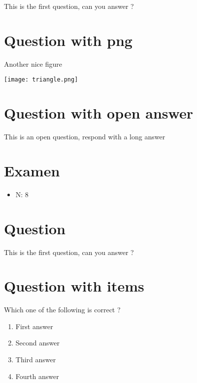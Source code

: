 \documentclass[a4paper,11pt,twoside]{article}
\begin{document}
This is the first question, can you answer ?



\section*{Question with png}
\label{sec:orge5484e8}

Another nice figure

\begin{center}
\texttt{[image: triangle.png]}
\end{center}



\section*{Question with open answer}
\label{sec:orga753518}

This is an open question, respond with a long answer


\subsection*{}
\label{sec:org8df2900}

\cleardoublepage

\section*{Examen}
\label{sec:org1f82a00}
\begin{itemize}
\item N: 8
\end{itemize}
\section*{Question}
\label{sec:org13194cb}

This is the first question, can you answer ?



\section*{Question with items}
\label{sec:orgfb9f5df}

Which one of the following is correct ?

\begin{enumerate}
\item First answer
\item Second answer
\item Third answer
\item Fourth answer
\end{enumerate}
\end{document}
